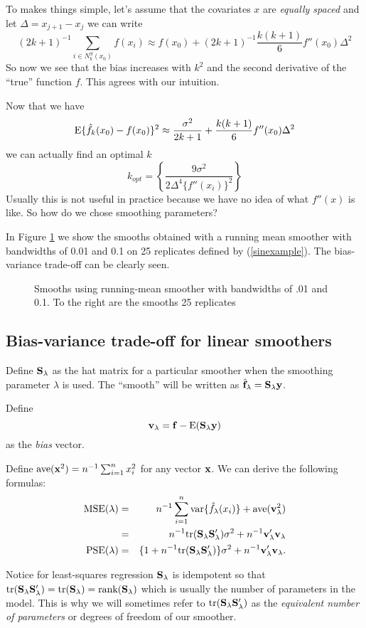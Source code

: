 To makes things simple, let's assume that the covariates $x$ are {\it equally spaced} and
let $\Delta = x_{j+1}-x_j$ we can write 
\[
(2k+1)^{-1}\sum_{i \in N^S_k(x_0)} f(x_i) \approx f(x_0) + (2k+1)^{-1}\frac{k(k+1)}{6} f''(x_0) \Delta^2
\]
So now we see that the bias increases with $k^2$ and the second
derivative of the ``true'' function $f$. This agrees with our
intuition.
 
Now that we have
\[
\mbox{E}\{\hat{f}_k(x_0) - f(x_0)\}^2 \approx \frac{\sigma^2}{2k+1} + \frac{k(k+1)}{6} f''(x_0) \Delta^2
\]
we can actually find an optimal $k$
\[
k_{opt} = \left\{ \frac{9\sigma^2}{2\Delta^4\{f''(x_i)\}^2}\right\}
\]
Usually this is not useful in practice because we have no idea of what
$f''(x)$ is like. So how do we chose smoothing parameters?

In Figure \ref{f5.1.2} we show the smooths obtained with a running
mean smoother with bandwidths of 0.01 and 0.1 on 25 replicates defined
by (\ref{sinexample}). The bias-variance trade-off can be clearly seen.

\begin{figure}
\centerline{}
\caption{\label{f5.1.2}Smooths using running-mean smoother with bandwidths of .01
  and 0.1. To the right are the smooths 25 replicates}
\end{figure}


\subsection{Bias-variance trade-off for linear smoothers}
Define ${\mathbf S}_{\lambda}$ as the hat matrix for a particular smoother when
the smoothing parameter $\lambda$ is used. The ``smooth'' will be
written as $\hat{{\mathbf f}}_{\lambda} = {\mathbf S}_{\lambda} {\mathbf y}$. 

Define 
\[
{\mathbf v}_{\lambda} = {\mathbf f} - \mbox{E}({\mathbf S}_{\lambda}{\mathbf y})
\] 
as the {\it bias} vector.

Define $\mbox{ave}({\mathbf x}^2) = n^{-1} \sum_{i=1}^n x_i^2$ for any vector
${\mathbf x}$. We can derive the following formulas:
\begin{eqnarray*}
\mbox{MSE}(\lambda) &=& n^{-1} \sum_{i=1}^n
\mbox{var}\{\hat{f}_{\lambda}(x_i)\} + \mbox{ave} ( {\mathbf v}_{\lambda}^2 ) \\
&=& n^{-1}\mbox{tr}({\mathbf S}_{\lambda}{\mathbf S}_{\lambda}') \sigma^2 + n^{-1}
{\mathbf v}_{\lambda}'{\mathbf v}_{\lambda}\\
\mbox{PSE}(\lambda) &=& \{1 + n^{-1} \mbox{tr}({\mathbf S}_{\lambda}{\mathbf S}_{\lambda}')
\} \sigma^2 +  n^{-1}
{\mathbf v}_{\lambda}'{\mathbf v}_{\lambda}.
\end{eqnarray*}

Notice for least-squares regression ${\mathbf S}_{\lambda}$ is idempotent so
that $\mbox{tr}({\mathbf S}_{\lambda}{\mathbf S}_{\lambda}') = \mbox{tr}({\mathbf S}_{\lambda}) =
\mbox{rank}({\mathbf S}_{\lambda})$ which is usually the
number of parameters in the model. This is why we will sometimes refer
to $\mbox{tr}({\mathbf S}_{\lambda}{\mathbf S}_{\lambda}')$ as the {\it equivalent number of
  parameters} or degrees of freedom of our smoother.
